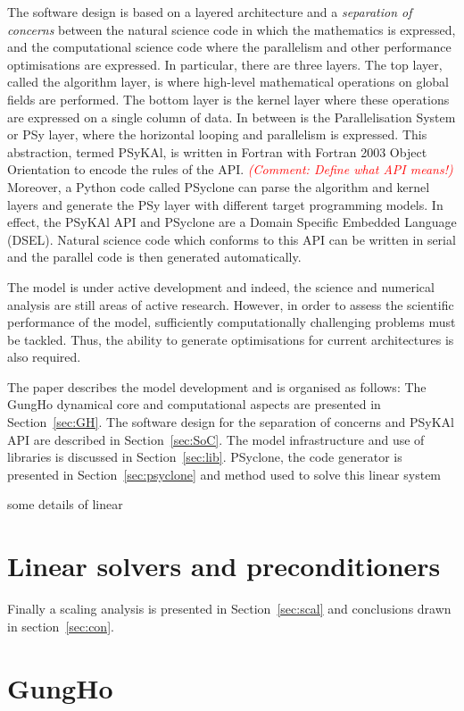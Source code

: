 \documentclass[times]{elsarticle}
\begin{document}
The software design is based on a layered architecture and a 
{\em separation of concerns} between the natural science code in which
the mathematics is expressed, and the computational science code where the
parallelism and other performance optimisations are expressed. In particular,
there are three layers. The top layer, called the algorithm layer, is where high-level mathematical 
operations on global fields are performed. The bottom layer is the kernel layer
where these operations are expressed on a single column of data. In between is the
Parallelisation System or PSy layer, where the horizontal looping and parallelism is
expressed. This abstraction, termed PSyKAl, is written in Fortran with Fortran 2003
Object Orientation to encode the rules of the API. \textcolor{red}{\em (Comment: Define what API means!)}
Moreover, a Python code called PSyclone can parse the algorithm and kernel layers and
generate the PSy layer with different target programming models. In effect, the PSyKAl API
and PSyclone are a Domain Specific Embedded Language (DSEL). Natural science code which
conforms to this API can be written in serial and the parallel code is then generated automatically.

The model is under active development and indeed, the science and
numerical analysis are still areas of active research. However, in
order to assess the scientific performance of the model, sufficiently
computationally challenging problems must be tackled. Thus, the
ability to generate optimisations for current architectures is also
required. 

The paper describes the model development and is organised as follows:
The GungHo dynamical core and computational aspects are presented in
Section~\ref{sec:GH}. The software design for the separation of
concerns and PSyKAl API are described in
Section~\ref{sec:SoC}. The model infrastructure and use of libraries
is discussed in Section~\ref{sec:lib}. PSyclone, the code generator is
presented in Section~\ref{sec:psyclone} and method used to solve this linear system 


some details of linear \section{\label{sec:Solver}Linear solvers and preconditioners} 

Finally a scaling analysis is
presented in Section~\ref{sec:scal} and conclusions drawn in
section~\ref{sec:con}.

\section{\label{sec:GH}GungHo}
\end{document}
